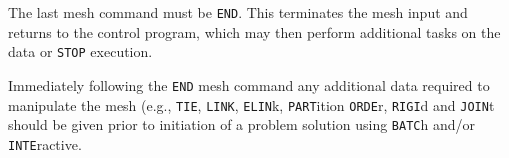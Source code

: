 \headb

The last mesh command must be {\tt END}.  This terminates
the mesh input and returns to the control program, which may
then perform additional tasks on the data or {\tt STOP} execution.

Immediately following the {\tt END} mesh command any additional
data required to manipulate the mesh (e.g., {\tt TIE}, {\tt LINK},
{\tt ELIN}k, {\tt PART}ition {\tt ORDE}r, {\tt RIGI}d and {\tt JOIN}t
should be given
prior to initiation of a problem solution using {\tt BATC}h and/or
{\tt INTE}ractive.
\vfil\eject
